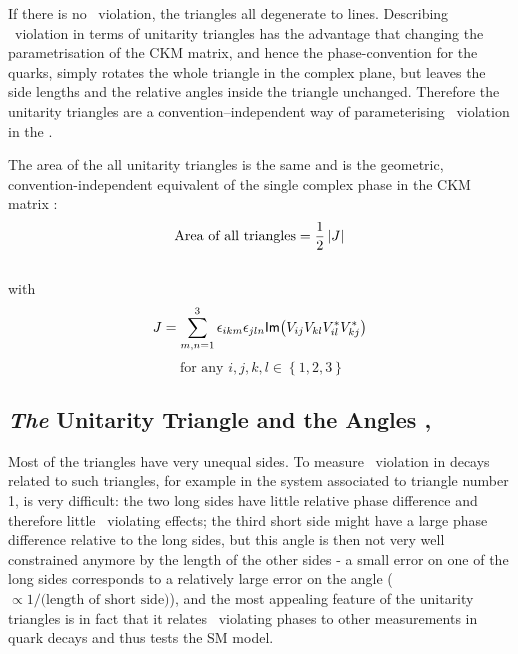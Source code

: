 If there is no \cp\ violation, the triangles all degenerate to
 lines. Describing \cp\ violation in terms of unitarity triangles has
 the advantage that changing the parametrisation of the CKM matrix,
 and hence the phase-convention for the quarks, simply rotates the
 whole triangle in the complex plane, but leaves the side lengths and
 the relative angles inside the triangle unchanged. Therefore the
 unitarity triangles are a convention--independent way of parameterising
 \cp\ violation in the \sm.

 The area of the all unitarity triangles is the same and is the
 geometric, convention-independent equivalent of the single complex
 phase in the CKM matrix \cite{Jarlskog:triangle_area}:
\begin{equation}
\mbox{Area of all triangles} = \frac{1}{2} \left|J\right|
\end{equation}\\
with
\begin{equation}
J=\sum_{m,n=1}^3 \epsilon_{ikm}\epsilon_{jln} 
  \mathsf{Im}\!\left( V_{ij} V_{kl} V_{il}^* V_{kj}^* \right)
\end{equation}
\begin{displaymath}
\mbox{ for any } i,j,k,l \in \left\{1,2,3\right\}
\end{displaymath}

\subsection{\emph{The} Unitarity Triangle and the Angles \gam, \bet}
\label{sec:th.b.thetriangle}
 Most of the triangles have very unequal sides. To measure \cp\
 violation in decays related to such triangles, for example in the
 \prt{K^0} system associated to triangle number 1, is very difficult:
 the two long sides have little relative phase difference and
 therefore little \cp\ violating effects; the third short side might have a
 large phase difference relative to the long sides, but this angle is
 then not very well constrained anymore by the length of the other
 sides - a small error on one of the long sides corresponds to a
 relatively large error on the angle ($\propto 1/\mbox{(length of
 short side)}$), and the most appealing feature of the unitarity
 triangles is in fact that it relates \cp\ violating phases to other
 measurements in quark decays and thus tests the SM model.


